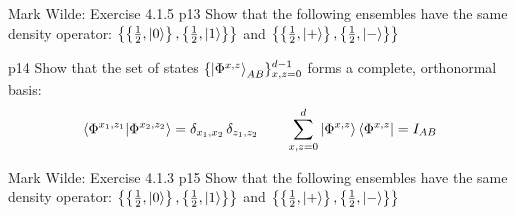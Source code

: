 \documentclass[a4paper, 11pt]{article}
\begin{document}

\begin{problem}{%
		Mark Wilde: Exercise 4.1.5
	}{p13%
	}
	 Show that the following ensembles have the same density operator: $\left\{\left\{\frac12,\ket{0}\right\},\left\{\frac12,\ket{1}\right\}\right\}$ and $\left\{\left\{\frac12,\ket{+}\right\},\left\{\frac12,\ket{-}\right\}\right\}$
\end{problem}


\begin{problem}{%
	}{p14%
	}
	Show that the set of states $\{\ket{\Phi^{x,z}}_{AB}\}^{d-1}_{x,z=0}$ forms a complete, orthonormal basis:$$\bra{\Phi^{x_1,z_1}}\ket{\Phi^{x_2,z_2}}=\delta_{x_1,x_2}\,\delta_{z_1,z_2}\qquad \sum_{x,z=0}^d\ket{\Phi^{x,z}}\bra{\Phi^{x,z}}=I_{AB}$$
\end{problem}


\begin{problem}{%
		Mark Wilde: Exercise 4.1.3
	}{p15%
	}
	Show that the following ensembles have the same density operator: $\left\{\left\{\frac12,\ket{0}\right\},\left\{\frac12,\ket{1}\right\}\right\}$ and $\left\{\left\{\frac12,\ket{+}\right\},\left\{\frac12,\ket{-}\right\}\right\}$
\end{problem}

\end{document}
